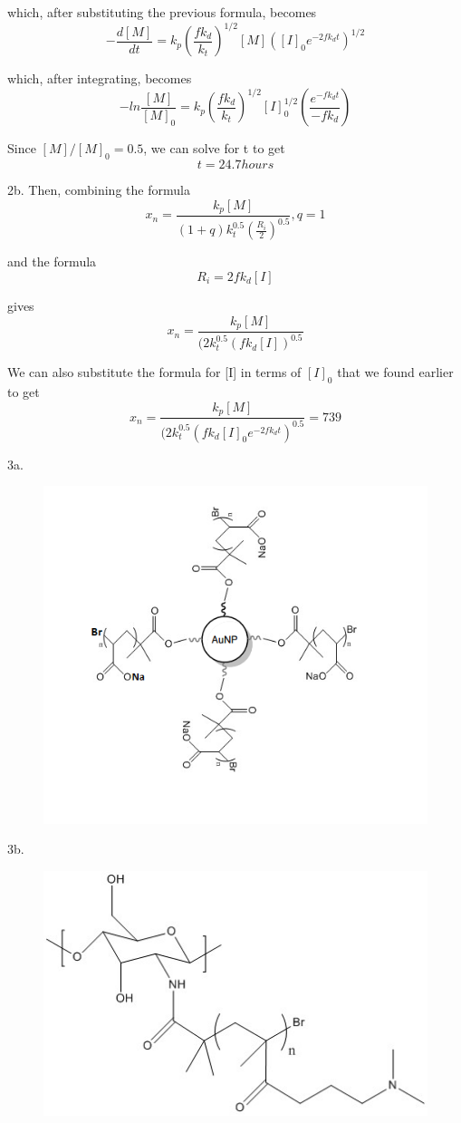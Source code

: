 \documentclass{article}
\begin{document}
which, after substituting the previous formula, becomes
$$-\frac{d[M]}{dt}=k_p\left(\frac{fk_d}{k_t}\right)^{1/2}[M]\left([I]_0e^{-2fk_dt}\right)^{1/2}$$

which, after integrating, becomes
$$-ln\frac{[M]}{[M]_0}=k_p\left(\frac{fk_d}{k_t}\right)^{1/2}[I]_0^{1/2}\left(\frac{e^{-fk_dt}}{-fk_d}\right)$$

Since $[M]/[M]_0=0.5$, we can solve for t to get
$$t=24.7 hours$$

2b. Then, combining the formula
$$x_n=\frac{k_p[M]}{(1+q)k_t^{0.5}(\frac{R_i}{2})^{0.5}},q=1$$

and the formula
$$R_i=2fk_d[I]$$

gives
$$x_n=\frac{k_p[M]}{(2k_t^{0.5}(fk_d[I])^{0.5}}$$

We can also substitute the formula for [I] in terms of $[I]_0$ that we found earlier to get
$$x_n=\frac{k_p[M]}{(2k_t^{0.5}(fk_d[I]_0e^{-2fk_dt})^{0.5}}=739$$


3a. \begin{figure}[!h]
  \centering
 \includegraphics[scale=0.5]{P3a.png}
\end{figure}
\vspace{50mm}

3b.
 \begin{figure}[h]
  \centering
 \includegraphics[scale=0.7]{P3b.jpg}
\end{figure}
\end{document}

